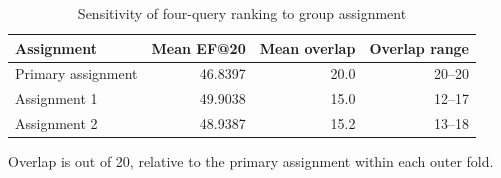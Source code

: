 \par
\begin{table}[H]
\centering
\begin{threeparttable}
\caption{Sensitivity of four-query ranking to group assignment}\label{tab:query}
\begin{tabular}{@{}lrrr@{}}
\toprule
Assignment & Mean EF@20 & Mean overlap & Overlap range\\
\midrule
Primary assignment & 46.8397 & 20.0 & 20--20\\
Assignment 1 & 49.9038 & 15.0 & 12--17\\
Assignment 2 & 48.9387 & 15.2 & 13--18\\
\bottomrule
\end{tabular}
\begin{tablenotes}[flushleft]
\item[] Overlap is out of 20, relative to the primary assignment within each outer fold.
\end{tablenotes}
\end{threeparttable}
\end{table}
\par
